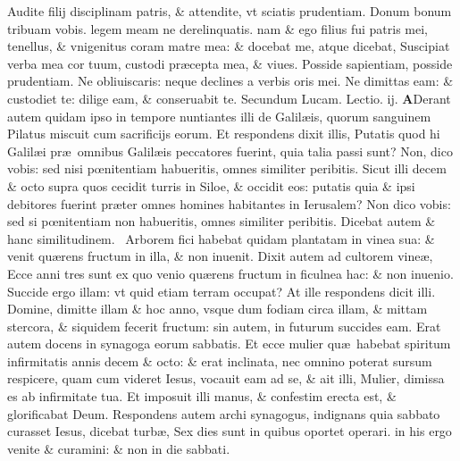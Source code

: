 \documentclass[a5paper,10pt]{book}
\def\leftmarginnote{%
	\lrmarginnote{\hskip -\marginparsep \hskip -6.5em}}
\def\ae{æ}
\def\oe{œ}
\begin{document}
\begin{multicols*}{2}
Audite\leftmarginnote{\begin{flushright}ca. 4.\end{flushright}} filij disciplinam patris, \& attendite, vt sciatis prudentiam.
Donum bonum tribuam vobis. legem meam ne derelinquatis. nam \& ego filius fui patris mei, tenellus, \& vnigenitus coram matre mea: \& docebat me, atque dicebat, Suscipiat verba mea cor tuum, custodi pr\ae cepta mea, \& viues.
Posside sapientiam, posside prudentiam. Ne obliuiscaris: neque declines a verbis oris mei.
Ne dimittas eam: \& custodiet te: dilige eam, \& conseruabit te.
\newline \color{red} Secundum Lucam. \hfill Lectio. ij. \color{black}
\vspace{-.25em}
\lettrine[lines=2]{\bfseries \color{red} A}{}Derant\leftmarginnote{\begin{flushright}c. 13.\end{flushright}} autem quidam ipso in tempore nuntiantes illi de Galil\ae is, quorum sanguinem Pilatus miscuit cum sacrificijs eorum.
Et respondens dixit illis, Putatis quod hi Galil\ae i pr\ae \ omnibus Galil\ae is peccatores fuerint, quia talia passi sunt?
Non, dico vobis: sed nisi p\oe nitentiam habueritis, omnes similiter peribitis.
Sicut illi decem \& octo supra quos cecidit turris in Siloe, \& occidit eos: putatis quia \& ipsi debitores fuerint pr\ae ter omnes homines habitantes in Ierusalem?
Non dico vobis: sed si p\oe nitentiam non habueritis, omnes similiter peribitis.
Dicebat autem \& hanc similitudinem. \textdagger \ 
Arborem\leftmarginnote{\begin{flushright}B\end{flushright}} fici habebat quidam plantatam in vinea sua: \& venit qu\ae rens fructum in illa, \& non inuenit.
Dixit autem
ad cultorem vine\ae , Ecce anni tres sunt ex quo venio qu\ae rens fructum in ficulnea hac: \& non inuenio.
Succide ergo illam: vt quid etiam terram occupat?
At ille respondens dicit illi. Domine, dimitte illam \& hoc anno, vsque dum fodiam circa illam, \& mittam stercora, \& siquidem fecerit fructum: sin autem, in futurum succides eam.
\newline \indent Erat autem docens in synagoga eorum sabbatis.
Et ecce mulier qu\ae \ habebat spiritum infirmitatis annis decem \& octo: \& erat inclinata, nec omnino poterat sursum respicere, quam cum videret Iesus, vocauit eam ad se, \& ait illi, Mulier, dimissa es ab infirmitate tua.
Et imposuit illi manus, \& confestim erecta est, \& glorificabat Deum.
Respondens autem archi synagogus, indignans quia sabbato curasset Iesus, dicebat turb\ae , Sex dies sunt in quibus oportet operari. in his ergo venite \& curamini: \& non in die sabbati.

\end{multicols*}
\end{document}
